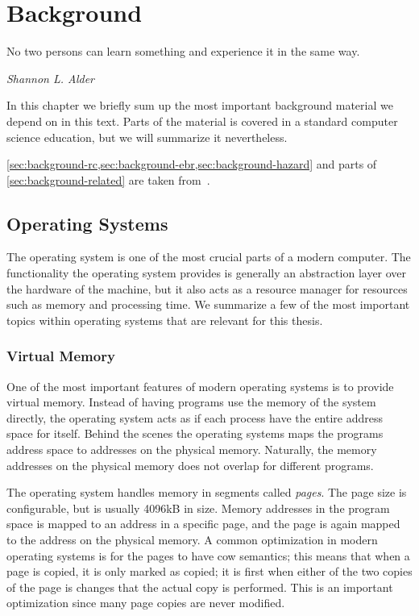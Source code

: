 \chapter{Background\label{ch:background}}

\epigraph{No two persons can learn something and experience it in the same way.}{\textit{Shannon L.
Alder}}

In this chapter we briefly sum up the most important background material we depend on in this text.
Parts of the material is covered in a standard computer science education, but we will summarize it
nevertheless.


\cref{sec:background-rc,sec:background-ebr,sec:background-hazard} and parts of
\cref{sec:background-related} are taken from~\cite{semester}.

\clearpage


\section{Operating Systems}

The operating system is one of the most crucial parts of a modern computer.  The functionality the
operating system provides is generally an abstraction layer over the hardware of the machine, but
it also acts as a resource manager for resources such as memory and processing time. We summarize a
few of the most important topics within operating systems that are relevant for this thesis.


\subsection{Virtual Memory\label{sec:background-virtual-memory}}

One of the most important features of modern operating systems is to provide virtual memory.
Instead of having programs use the memory of the system directly, the operating system acts as if
each process have the entire address space for itself. Behind the scenes the operating systems maps
the programs address space to addresses on the physical memory. Naturally, the memory addresses on
the physical memory does not overlap for different programs.

The operating system handles memory in segments called \emph{pages}. The page size is configurable,
but is usually 4096kB in size. Memory addresses in the program space is mapped to an address in a
specific page, and the page is again mapped to the address on the physical memory.
A common optimization in modern operating systems is for the pages to have \gls{cow} semantics;
this means that when a page is copied, it is only marked as copied; it is first when either of the
two copies of the page is changes that the actual copy is performed. This is an important
optimization since many page copies are never modified.


